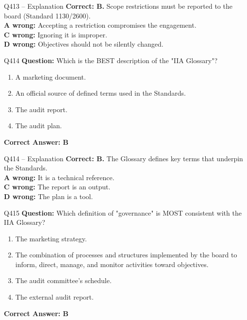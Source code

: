 \documentclass[aspectratio=169,10pt]{beamer}
\begin{document}
	\begin{frame}[t]{Q413 -- Explanation}
		\small
		\textbf{Correct: B.} Scope restrictions must be reported to the board (Standard 1130/2600). \\[4pt]
		\textbf{A wrong:} Accepting a restriction compromises the engagement. \\[2pt]
		\textbf{C wrong:} Ignoring it is improper. \\[2pt]
		\textbf{D wrong:} Objectives should not be silently changed.
	\end{frame}
	
	\begin{frame}[t]{Q414}
		\small
		\textbf{Question:} Which is the BEST description of the "IIA Glossary"?
		\begin{enumerate}[label=\Alph*.,itemsep=1pt,topsep=2pt]
			\item A marketing document.
			\item An official source of defined terms used in the Standards.
			\item The audit report.
			\item The audit plan.
		\end{enumerate}
		\vspace{4pt}
		\textbf{Correct Answer: B}
	\end{frame}
	
	\begin{frame}[t]{Q414 -- Explanation}
		\small
		\textbf{Correct: B.} The Glossary defines key terms that underpin the Standards. \\[4pt]
		\textbf{A wrong:} It is a technical reference. \\[2pt]
		\textbf{C wrong:} The report is an output. \\[2pt]
		\textbf{D wrong:} The plan is a tool.
	\end{frame}
	
	\begin{frame}[t]{Q415}
		\small
		\textbf{Question:} Which definition of "governance" is MOST consistent with the IIA Glossary?
		\begin{enumerate}[label=\Alph*.,itemsep=1pt,topsep=2pt]
			\item The marketing strategy.
			\item The combination of processes and structures implemented by the board to inform, direct, manage, and monitor activities toward objectives.
			\item The audit committee's schedule.
			\item The external audit report.
		\end{enumerate}
		\vspace{4pt}
		\textbf{Correct Answer: B}
	\end{frame}
	
\end{document}

